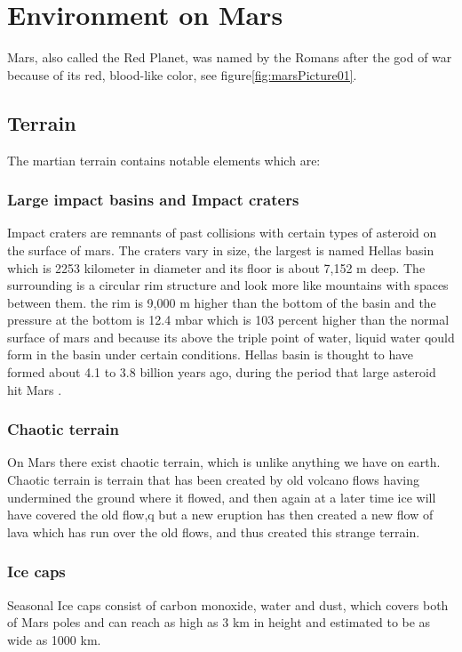 \chapter{Environment on Mars}\label{ch:environmentOnMars}

Mars, also called the Red Planet, was named by the Romans after the god of war because of its red, blood-like color, see figure\ref{fig:marsPicture01}. 

\section{Terrain} 
The martian terrain contains notable elements which are:

\subsection{Large impact basins and Impact craters}%
Impact craters are remnants of past collisions with certain types of asteroid on the surface of mars. The craters vary in size, the largest is named Hellas basin which is 2253 kilometer in diameter and its floor is about 7,152 m  deep. The surrounding is a circular rim structure and look more like mountains with spaces between them.
the rim is 9,000 m higher than the bottom of the basin and the pressure at the bottom is 12.4  mbar which is  103 percent higher than the normal surface of mars  and because its above the triple point of water, liquid water qould form in the basin under certain conditions. Hellas basin is thought to have formed about 4.1 to 3.8 billion years ago, during the period that large asteroid hit Mars \cite{hellas}.

\subsection{Chaotic terrain}
On Mars there exist chaotic terrain, which is unlike anything we have on earth.\\
Chaotic terrain is terrain that has been created by old volcano flows having undermined the ground where it flowed, and then again at a later time ice will have covered the old flow,q but a new eruption has then created a new flow of lava which has run over the old flows, and thus created this strange terrain\cite{CTerrain}.

\subsection{Ice caps}
Seasonal Ice caps consist of carbon monoxide, water and dust, which covers both of Mars poles and can reach as high as 3 km in height and estimated to be as wide as 1000 km.

